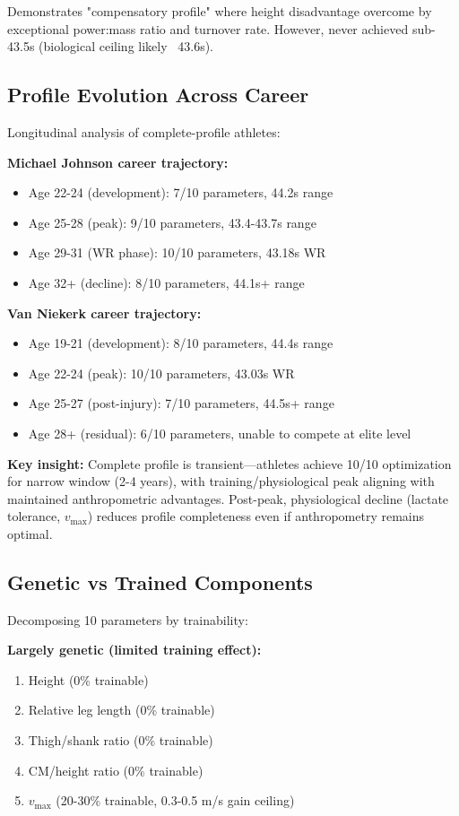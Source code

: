 Demonstrates "compensatory profile" where height disadvantage overcome by exceptional power:mass ratio and turnover rate. However, never achieved sub-43.5s (biological ceiling likely ~43.6s).

\subsection{Profile Evolution Across Career}

Longitudinal analysis of complete-profile athletes:

\textbf{Michael Johnson career trajectory:}
\begin{itemize}
    \item Age 22-24 (development): 7/10 parameters, 44.2s range
    \item Age 25-28 (peak): 9/10 parameters, 43.4-43.7s range
    \item Age 29-31 (WR phase): 10/10 parameters, 43.18s WR
    \item Age 32+ (decline): 8/10 parameters, 44.1s+ range
\end{itemize}

\textbf{Van Niekerk career trajectory:}
\begin{itemize}
    \item Age 19-21 (development): 8/10 parameters, 44.4s range
    \item Age 22-24 (peak): 10/10 parameters, 43.03s WR
    \item Age 25-27 (post-injury): 7/10 parameters, 44.5s+ range
    \item Age 28+ (residual): 6/10 parameters, unable to compete at elite level
\end{itemize}

\textbf{Key insight:} Complete profile is transient—athletes achieve 10/10 optimization for narrow window (2-4 years), with training/physiological peak aligning with maintained anthropometric advantages. Post-peak, physiological decline (lactate tolerance, $v_{\max}$) reduces profile completeness even if anthropometry remains optimal.

\subsection{Genetic vs Trained Components}

Decomposing 10 parameters by trainability:

\textbf{Largely genetic (limited training effect):}
\begin{enumerate}
    \item Height (0\% trainable)
    \item Relative leg length (0\% trainable)
    \item Thigh/shank ratio (0\% trainable)
    \item CM/height ratio (0\% trainable)
    \item $v_{\max}$ (20-30\% trainable, 0.3-0.5 m/s gain ceiling)
\end{enumerate}

